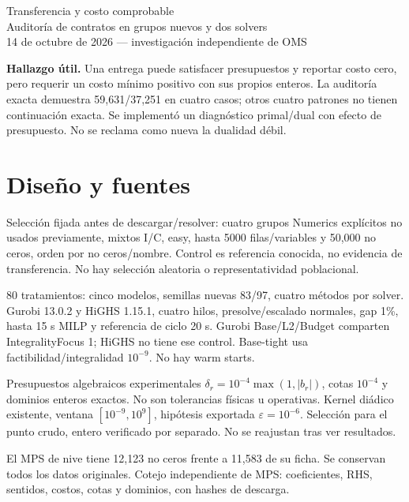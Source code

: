 \documentclass[10pt,a4paper]{article}
\begin{document}
\begin{center}{\Large Transferencia y costo comprobable}\\[4pt]
{\large Auditoría de contratos en grupos nuevos y dos solvers}\\[3pt]
14 de octubre de 2026 --- investigación independiente de OMS\end{center}
\textbf{Hallazgo útil.} Una entrega puede satisfacer presupuestos y reportar
costo cero, pero requerir un costo mínimo positivo con sus propios enteros.
La auditoría exacta demuestra 59,631/37,251 en cuatro casos; otros cuatro
patrones no tienen continuación exacta. Se implementó un diagnóstico primal/dual
con efecto de presupuesto. No se reclama como nueva la dualidad débil.
\section*{Diseño y fuentes}
Selección fijada antes de descargar/resolver: cuatro grupos Numerics explícitos
no usados previamente, mixtos I/C, easy, hasta 5000 filas/variables y 50,000 no
ceros, orden por no ceros/nombre. Control es referencia conocida, no evidencia
de transferencia. No hay selección aleatoria o representatividad poblacional.

80 tratamientos: cinco modelos, semillas nuevas 83/97, cuatro métodos por
solver. Gurobi 13.0.2 y HiGHS 1.15.1, cuatro hilos, presolve/escalado normales,
gap 1\%, hasta 15 s MILP y referencia de ciclo 20 s. Gurobi Base/L2/Budget
comparten IntegralityFocus 1; HiGHS no tiene ese control. Base-tight usa
factibilidad/integralidad $10^{-9}$. No hay warm starts.

Presupuestos algebraicos experimentales $\delta_r=10^{-4}\max(1,|b_r|)$,
cotas $10^{-4}$ y dominios enteros exactos. No son tolerancias físicas u
operativas. Kernel diádico existente, ventana $[10^{-9},10^9]$,
hipótesis exportada $\varepsilon=10^{-6}$. Selección para el punto crudo,
entero verificado por separado. No se reajustan tras ver resultados.

El MPS de nive tiene 12,123 no ceros frente a 11,583 de su ficha. Se conservan
todos los datos originales. Cotejo independiente de MPS: coeficientes, RHS,
sentidos, costos, cotas y dominios, con hashes de descarga.
\end{document}

